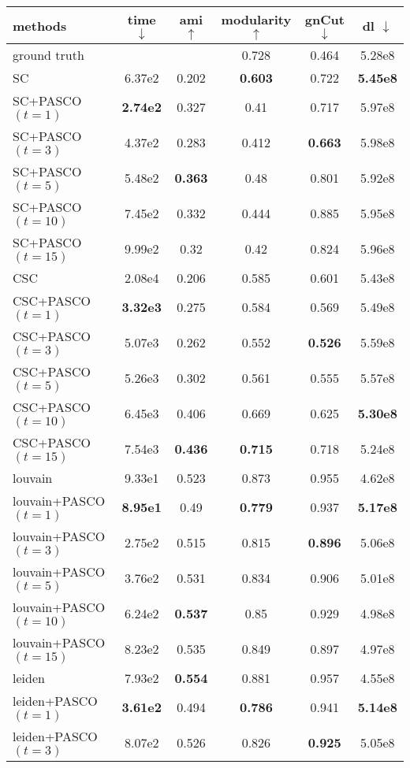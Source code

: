 \begin{tabular}{lccccc}
\toprule
methods & time $\downarrow$ & ami $\uparrow$ & modularity $\uparrow$ & gnCut $\downarrow$ & dl $\downarrow$ \\
\midrule
ground truth &  &  & 0.728 & 0.464 & 5.28e8 \\
\midrule
SC & 6.37e2 & 0.202 & \textbf{0.603} & 0.722 & \textbf{5.45e8} \\
SC+PASCO $(t=1)$ & \textbf{2.74e2} & 0.327 & 0.41 & 0.717 & 5.97e8 \\
SC+PASCO $(t=3)$ & 4.37e2 & 0.283 & 0.412 & \textbf{0.663} & 5.98e8 \\
SC+PASCO $(t=5)$ & 5.48e2 & \textbf{0.363} & 0.48 & 0.801 & 5.92e8 \\
SC+PASCO $(t=10)$ & 7.45e2 & 0.332 & 0.444 & 0.885 & 5.95e8 \\
SC+PASCO $(t=15)$ & 9.99e2 & 0.32 & 0.42 & 0.824 & 5.96e8 \\
\midrule
CSC & 2.08e4 & 0.206 & 0.585 & 0.601 & 5.43e8 \\
CSC+PASCO $(t=1)$ & \textbf{3.32e3} & 0.275 & 0.584 & 0.569 & 5.49e8 \\
CSC+PASCO $(t=3)$ & 5.07e3 & 0.262 & 0.552 & \textbf{0.526} & 5.59e8 \\
CSC+PASCO $(t=5)$ & 5.26e3 & 0.302 & 0.561 & 0.555 & 5.57e8 \\
CSC+PASCO $(t=10)$ & 6.45e3 & 0.406 & 0.669 & 0.625 & \textbf{5.30e8} \\
CSC+PASCO $(t=15)$ & 7.54e3 & \textbf{0.436} & \textbf{0.715} & 0.718 & 5.24e8 \\
\midrule
louvain & 9.33e1 & 0.523 & 0.873 & 0.955 & 4.62e8 \\
louvain+PASCO $(t=1)$ & \textbf{8.95e1} & 0.49 & \textbf{0.779} & 0.937 & \textbf{5.17e8} \\
louvain+PASCO $(t=3)$ & 2.75e2 & 0.515 & 0.815 & \textbf{0.896} & 5.06e8 \\
louvain+PASCO $(t=5)$ & 3.76e2 & 0.531 & 0.834 & 0.906 & 5.01e8 \\
louvain+PASCO $(t=10)$ & 6.24e2 & \textbf{0.537} & 0.85 & 0.929 & 4.98e8 \\
louvain+PASCO $(t=15)$ & 8.23e2 & 0.535 & 0.849 & 0.897 & 4.97e8 \\
\midrule
leiden & 7.93e2 & \textbf{0.554} & 0.881 & 0.957 & 4.55e8 \\
leiden+PASCO $(t=1)$ & \textbf{3.61e2} & 0.494 & \textbf{0.786} & 0.941 & \textbf{5.14e8} \\
leiden+PASCO $(t=3)$ & 8.07e2 & 0.526 & 0.826 & \textbf{0.925} & 5.05e8 \\

\end{tabular}
